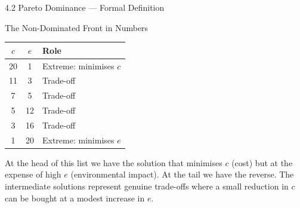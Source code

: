 \documentclass[aspectratio=169,10pt]{beamer}
\begin{document}
\begin{frame}[allowframebreaks]{4.2 Pareto Dominance --- Formal Definition}
  \begin{block}{The Non-Dominated Front in Numbers}
    \begin{center}
      \small
      \begin{tabular}{cc l}
        \toprule
        $c$ & $e$ & Role \\
        \midrule
        20 & 1  & Extreme: minimises $c$ \\
        11 & 3  & Trade-off \\
        7  & 5  & Trade-off \\
        5  & 12 & Trade-off \\
        3  & 16 & Trade-off \\
        1  & 20 & Extreme: minimises $e$ \\
        \bottomrule
      \end{tabular}
    \end{center}
  \end{block}

  At the head of this list we have the solution that minimises $c$ (cost) but at
  the expense of high $e$ (environmental impact).  At the tail we have the
  reverse.  The intermediate solutions represent genuine trade-offs where a small
  reduction in $c$ can be bought at a modest increase in $e$.

\end{frame}
\end{document}
